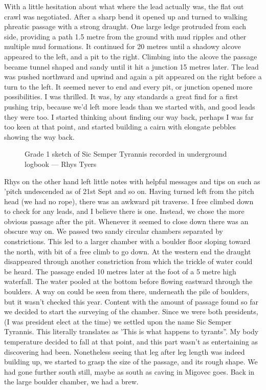 With a little hesitation about what where the lead actually was, the flat out crawl was negotiated. After a sharp bend it opened up and turned to walking phreatic passage with a strong draught. One large ledge protruded from each side, providing a path 1.5 metre from the ground with mud ripples and other multiple mud formations. It continued for 20 metres until a shadowy alcove appeared to the left, and a pit to the right. Climbing into the alcove the passage became tunnel shaped and sandy until it hit a junction 15 metres later. The lead was pushed northward and upwind and again a pit appeared on the right before a turn to the left. It seemed never to end and every pit, or junction opened more possibilities. I was thrilled. It was, by any standards a great find for a first pushing trip, because we'd left more leads than we started with, and good leads they were too. I started thinking about finding our way back, perhaps I was far too keen at that point, and started building a cairn with elongate pebbles showing the way back. 

\begin{figure}[t!]
\checkoddpage \ifoddpage \forcerectofloat \else \forceversofloat \fi
\centering
{}
\caption{Grade 1 sketch of Sic Semper Tyrannis recorded in underground logbook --- Rhys Tyers}
\label{G1 sketch}
\end{figure}

Rhys on the other hand left little notes with helpful messages and tips on such as 'pitch undescended as of 21st Sept and so on. Having turned left from the pitch head (we had no rope), there was an awkward pit traverse. I free climbed down to check for any leads, and I believe there is one. Instead, we chose the more obvious passage after the pit. Whenever it seemed to close down there was an obscure way on. We passed two sandy circular chambers separated by constrictions. This led to a larger chamber with a boulder floor sloping toward the north, with bit of a free climb to go down. At the western end the draught disappeared through another constriction from which the trickle of water could be heard. The passage ended 10 metres later at the foot of a 5 metre high waterfall. The water pooled at the bottom before flowing eastward through the boulders. A way on could be seen from there, underneath the pile of boulders, but it wasn't checked this year. Content with the amount of passage found so far we decided to start the surveying of the chamber. Since we were both presidents, (I was president elect at the time) we settled upon the name Sic Semper Tyrannis. This literally translates as 'This is what happens to tyrants''. My body temperature decided to fall at that point, and this part wasn't as entertaining as discovering had been. Nonetheless seeing that leg after leg length was indeed building up, we started to grasp the size of the passage, and its rough shape. We had gone further south still, maybe as south as caving in Migovec goes. Back in the large boulder chamber, we had a brew.

